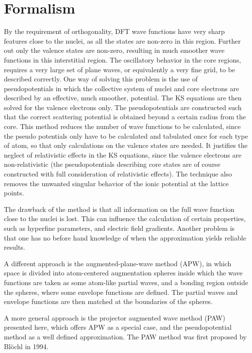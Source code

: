 \documentclass[a4paper]{article}
\begin{document}
\section{Formalism}\label{sec: paw}
By the requirement of orthogonality, DFT wave functions have very
sharp features close to the nuclei, as all the states are non-zero in
this region. Further out only the valence states are non-zero,
resulting in much smoother wave functions in this interstitial region.
The oscillatory behavior in the core regions, requires a very large
set of plane waves, or equivalently a very fine grid, to be described
correctly. One way of solving this problem is the use of
pseudopotentials in which the collective system of nuclei and core
electrons are described by an effective, much smoother, potential.
The KS equations are then solved for the valence electrons only.  The
pseudopotentials are constructed such that the correct scattering
potential is obtained beyond a certain radius from the core. This
method reduces the number of wave functions to be calculated, since
the pseudo potentials only have to be calculated and tabulated once
for each type of atom, so that only calculations on the valence states
are needed. It justifies the neglect of relativistic effects in the KS
equations, since the valence electrons are non-relativistic (the
pseudopotentials describing core states are of course constructed with
full consideration of relativistic effects). The technique also
removes the unwanted singular behavior of the ionic potential at the
lattice points.
\par The drawback of the method is that all information on the full
wave function close to the nuclei is lost. This can influence the
calculation of certain properties, such as hyperfine parameters, and
electric field gradients. Another problem is that one has no before
hand knowledge of when the approximation yields reliable results.
\par A different approach is the augmented-plane-wave method
(APW), in which space is divided into atom-centered augmentation
spheres inside which the wave functions are taken as some
atom-like partial waves, and a bonding region outside the spheres,
where some envelope functions are defined. The partial waves and
envelope functions are then matched at the boundaries of the
spheres.
\par A more general approach is the projector augmented wave method
(PAW) presented here, which offers APW as a special
case\cite{Blochl2003}, and the pseudopotential method as a well
defined approximation\cite{Kresse1999}. The PAW method was first
proposed by Bl{\"o}chl in 1994\cite{Blochl1994}.
\end{document}
